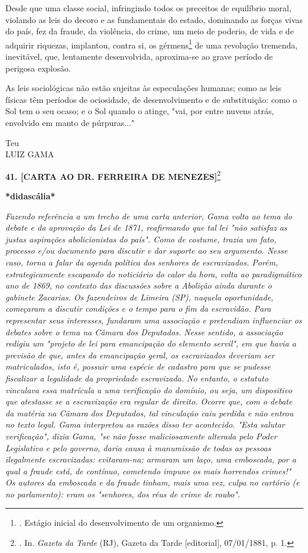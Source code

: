 Desde que uma classe social, infringindo todos os preceitos de
equilíbrio moral, violando as leis do decoro e as fundamentais do
estado, dominando as forças vivas do país, fez da fraude, da violência,
do crime, um meio de poderio, de vida e de adquirir riquezas, implantou,
contra si, os gérmens\footnote{. Estágio inicial do desenvolvimento de
  um organismo.} de uma revolução tremenda, inevitável, que, lentamente
desenvolvida, aproxima-se ao grave período de perigosa explosão.

As leis sociológicas não estão sujeitas às especulações humanas; como as
leis físicas têm períodos de ociosidade, de desenvolvimento e de
substituição: como o Sol tem o seu ocaso; e o Sol quando o atinge, "vai,
por entre nuvens atrás, envolvido em manto de púrpuras..."

Teu\\
LUIZ GAMA

\textbf{41. {[}CARTA AO DR. FERREIRA DE MENEZES{]}}\footnote{. In.
  \emph{Gazeta da Tarde} (RJ), Gazeta da Tarde {[}editorial{]},
  07/01/1881, p. 1.}

\textbf{*didascália*}

\emph{Fazendo referência a um trecho de uma carta anterior, Gama volta
ao tema do debate e da aprovação da Lei de 1871, reafirmando que tal lei
"não satisfaz as justas aspirações abolicionistas do país". Como de
costume, trazia um fato, processo e/ou documento para discutir e dar
suporte ao seu argumento. Nesse caso, torna a falar da agenda política
dos senhores de escravizados. Porém, estrategicamente escapando do
noticiário do calor da hora, volta ao paradigmático ano de 1869, no
contexto das discussões sobre a Abolição ainda durante o gabinete
Zacarias. Os fazendeiros de Limeira (SP), naquela oportunidade,
começaram a discutir condições e o tempo para o fim da escravidão. Para
representar seus interesses, fundaram uma associação e pretendiam
influenciar os debates sobre o tema na Câmara dos Deputados. Nesse
sentido, a associação redigiu um "projeto de lei para emancipação do
elemento servil", em que havia a previsão de que, antes da emancipação
geral, os escravizados deveriam ser matriculados, isto é, possuir uma
espécie de cadastro para que se pudesse fiscalizar a legalidade da
propriedade escravizada. No entanto, o estatuto vinculava essa matrícula
a uma verificação do domínio, ou seja, um dispositivo que atestasse se a
escravização era regular de direito. Ocorre que, com o debate da matéria
na Câmara dos Deputados, tal vinculação caiu perdida e não entrou no
texto legal. Gama interpretou as razões disso ter acontecido. "Esta
salutar verificação", dizia Gama, "se não fosse maliciosamente alterada
pelo Poder Legislativo e pelo governo, daria causa à manumissão de todas
as pessoas ilegalmente escravizadas: evitaram-na; armaram um laço, uma
emboscada, por a qual a fraude está, de contínuo, cometendo impune os
mais horrendos crimes!" Os autores da emboscada e da fraude tinham, mais
uma vez, culpa no cartório (e no parlamento): eram os "senhores, dos
réus de crime de roubo".}

